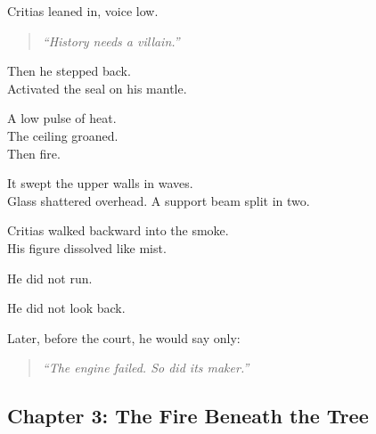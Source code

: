 \documentclass[9pt]{article}
\begin{document}
Critias leaned in, voice low.

\begin{quote}
\textit{“History needs a villain.”}
\end{quote}

Then he stepped back.\\
Activated the seal on his mantle.

\vspace{1em}

A low pulse of heat.\\
The ceiling groaned.\\
Then fire.

It swept the upper walls in waves.\\
Glass shattered overhead.  
A support beam split in two.

\vspace{1em}

Critias walked backward into the smoke.\\
His figure dissolved like mist.

He did not run.

He did not look back.

\vspace{1em}

Later, before the court, he would say only:

\begin{quote}
\textit{“The engine failed. So did its maker.”}
\end{quote}

\newpage

\subsection*{Chapter 3: The Fire Beneath the Tree}

\vspace{1in}
\end{document}
